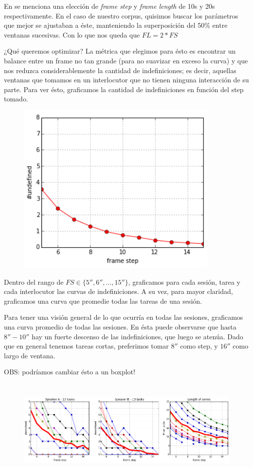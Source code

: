 En \cite{KOU2009} se menciona una elección de \emph{frame step} y \emph{frame length} de 10s y 20s respectivamente. En el caso de nuestro corpus, quisimos buscar los parámetros que mejor se ajustaban a éste, manteniendo la superposición del 50\% entre ventanas sucesivas. Con lo que nos queda que $FL = 2 * FS$

¿Qué queremos optimizar? La métrica que elegimos para ésto es encontrar un balance entre un frame no tan grande (para no suavizar en exceso la curva) y que nos reduzca considerablemente la cantidad de indefiniciones; es decir, aquellas ventanas que tomamos en un interlocutor que no tienen ninguna interacción de su parte. Para ver ésto, graficamos la cantidad de indefiniciones en función del step tomado.

\begin{figure}
\centering
\includegraphics[width=10cm]{images/window_selection.png}
\end{figure}



Dentro del rango de $FS \in \{5'',6'', \ldots ,15'' \}$, graficamos para cada sesión, tarea y cada interlocutor las curvas de indefiniciones. A su vez, para mayor claridad, graficamos una curva que promedie todas las tareas de una sesión.


Para tener una visión general de lo que ocurría en todas las sesiones, graficamos una curva promedio de todas las sesiones. En ésta puede observarse que hasta $8''-10''$ hay un fuerte descenso de las indefiniciones, que luego se atenúa. Dado que en general tenemos tareas cortas, preferimos tomar $8''$ como step, y $16''$ como largo de ventana.

OBS: podríamos cambiar ésto a un boxplot!

\begin{figure}
\centering
\includegraphics[height=5cm]{images/window_selection_for_session.png}
\end{figure}
